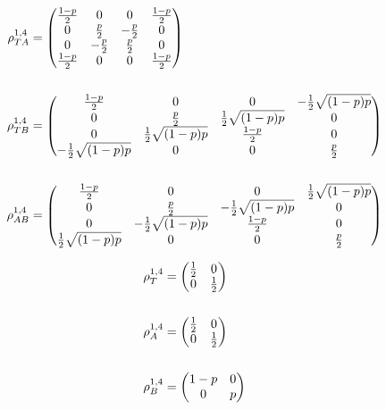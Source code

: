 \documentclass[12pt]{article}
\begin{document}
\begin{align*}
    \rho_{TA}^{1,4} &= \mqty(
        \frac{1-p}{2} & 0 & 0 & \frac{1-p}{2} \\
        0 & \frac{p}{2} & -\frac{p}{2} & 0 \\
        0 & -\frac{p}{2} & \frac{p}{2} & 0 \\
        \frac{1-p}{2} & 0 & 0 & \frac{1-p}{2}
    ) \\
    \\
    \rho_{TB}^{1,4} &= \mqty(
        \frac{1-p}{2} & 0 & 0 & -\frac{1}{2} \sqrt{(1-p) p} \\
        0 & \frac{p}{2} & \frac{1}{2} \sqrt{(1-p) p} & 0 \\
        0 & \frac{1}{2} \sqrt{(1-p) p} & \frac{1-p}{2} & 0 \\
        -\frac{1}{2} \sqrt{(1-p) p} & 0 & 0 & \frac{p}{2}
    ) \\
    \\
    \rho_{AB}^{1,4} &= \mqty(
        \frac{1-p}{2} & 0 & 0 & \frac{1}{2} \sqrt{(1-p) p} \\
        0 & \frac{p}{2} & -\frac{1}{2} \sqrt{(1-p) p} & 0 \\
        0 & -\frac{1}{2} \sqrt{(1-p) p} & \frac{1-p}{2} & 0 \\
        \frac{1}{2} \sqrt{(1-p) p} & 0 & 0 & \frac{p}{2}
    )
\end{align*}

\begin{align*}
    \rho_T^{1,4} &= \mqty(
        \frac{1}{2} & 0 \\
        0 & \frac{1}{2}
    ) \\
    \\
    \rho_A^{1,4} &= \mqty(
        \frac{1}{2} & 0 \\
        0 & \frac{1}{2}
    ) \\
    \\
    \rho_B^{1,4} &= \mqty(
        1-p & 0 \\
        0 & p
    )
\end{align*}
\end{document}
